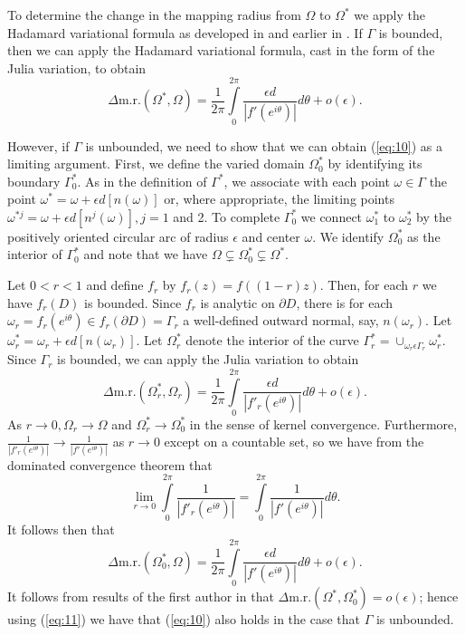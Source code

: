 To determine the change in the mapping radius from $\Omega$ to
$\Omega^\ast$ we apply the Hadamard variational formula as developed
in \cite{3} and earlier in \cite{11}.  If $\Gamma$ is bounded, then we
can apply the Hadamard variational formula, cast in the form of the
Julia variation, to obtain
\begin{equation}
\label{eq:10}
\Delta \mbox{m.r.} (\Omega^\ast,\Omega) =\frac{1}{2\pi}
\int\limits^{2\pi}_0 \frac{\epsilon d}{|f'(e^{i\theta})|} d\theta
+o(\epsilon).
\end{equation}

However, if $\Gamma$ is unbounded, we need to show that we can obtain
(\ref{eq:10}) as a limiting argument.  First, we define the varied
domain $\Omega^\ast_0$ by identifying its boundary $\Gamma^\ast_0$.
As in the definition of $\Gamma^\ast$, we associate with each point
$\omega\in\Gamma$ the point $\omega^\ast=\omega+ \epsilon
d[n(\omega)]$ or, where appropriate, the limiting points
$\omega^{\ast j} =\omega + \epsilon d [n^j (\omega)], j=1$ and 2.  To
complete $\Gamma^\ast_0$ we connect $\omega^\ast_1$ to
$\omega^\ast_2$ by the positively oriented circular arc of radius
$\epsilon$ and center $\omega$.  We identify $\Omega^\ast_0$ as the
interior of $\Gamma^\ast_0$ and note that we have $\Omega\subsetneq
\Omega^\ast_0 \subsetneq \Omega^\ast$. 

Let $0<r <1$ and define $f_r$ by $f_r(z)=f((1-r)z)$.  Then, for each
$r$ we have $f_r(D)$ is bounded.  Since $f_r$ is analytic on $\partial
D$, there is for each $\omega_r=f_r(e^{i\theta})\in f_r(\partial D)
=\Gamma_r$ a well-defined outward normal, say, $n(\omega_r)$.  Let
$\omega^\ast_r=\omega_r +\epsilon d [n(\omega_r)]$.  Let
$\Omega^\ast_r$ denote the interior of the curve
$\Gamma^\ast_r=\cup_{\omega_r\epsilon \Gamma_r} \omega^\ast_r$.
Since $\Gamma_r$ is bounded, we can apply the Julia variation to
obtain
$$\Delta \mbox{m.r.} (\Omega^\ast_r, \Omega_r) =\frac{1}{2\pi}
\int\limits^{2\pi}_0 \frac{\epsilon d}{|f'_r (e^{i\theta})|}
d\theta+o(\epsilon).$$
As $r\rightarrow 0, \Omega_r\rightarrow \Omega$ and $\Omega^\ast_r
\rightarrow \Omega^\ast_0$ in the sense of kernel convergence.
Furthermore, $\displaystyle{\frac{1}{|f'_r(e^{i\theta})|} \rightarrow
\frac{1}{|f'(e^{i\theta})|}}$ as $r\rightarrow 0$ except on a
countable set, so we have from the dominated convergence theorem that
$$\lim_{r\rightarrow 0} \int\limits^{2\pi}_0 \frac{1}{|f'_r
(e^{i\theta})|} =\int\limits^{2\pi}_0 \frac{1}{|f'(e^{i\theta})|}
d\theta.$$
It follows then that 
\begin{equation}
\label{eq:11}
\Delta\mbox{m.r.} (\Omega^\ast_0, \Omega) =\frac{1}{2\pi}
\int\limits^{2\pi}_0 \frac{\epsilon d}{|f'(e^{i\theta})|} d\theta
+o(\epsilon).
\end{equation}
It follows from results of the first author in \cite{3} that
$\Delta\mbox{m.r.} (\Omega^\ast, \Omega^\ast_0)=o(\epsilon)$; hence
using (\ref{eq:11}) we have that (\ref{eq:10}) also holds in the case
that $\Gamma$ is unbounded.

